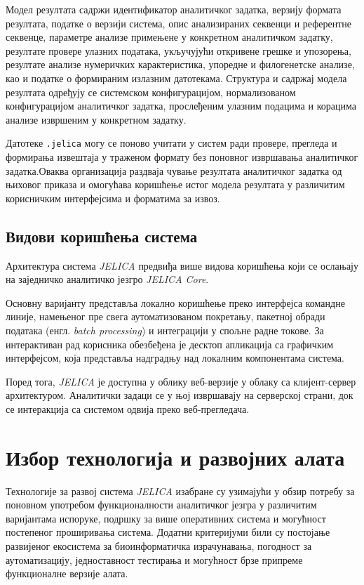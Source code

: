 \documentclass[12pt,oneside]{memoir}
\begin{document}
Модел резултата садржи идентификатор аналитичког задатка, верзију формата резултата, податке о верзији система, опис анализираних секвенци и референтне секвенце, параметре анализе примењене у конкретном аналитичком задатку, резултате провере улазних података, укључујући откривене грешке и упозорења, резултате анализе нумеричких карактеристика, упоредне и филогенетске анализе, као и податке о формираним излазним датотекама. Структура и садржај модела резултата одређују се системском конфигурацијом, нормализованом конфигурацијом аналитичког задатка, прослеђеним улазним подацима и корацима анализе извршеним у конкретном задатку.

Датотеке \texttt{.jelica} могу се поново учитати у систем ради провере, прегледа и формирања извештаја у траженом формату без поновног извршавања аналитичког задатка.Оваква организација раздваја чување резултата аналитичког задатка од њиховог приказа и омогућава коришћење истог модела резултата у различитим корисничким интерфејсима и форматима за извоз.


\subsection{Видови коришћења система}
\label{sec:forms-of-using-the-system}
Архитектура система \textit{JELICA} предвиђа више видова коришћења који се ослањају на заједничко аналитичко језгро \textit{JELICA Core}.

Основну варијанту представља локално коришћење преко интерфејса командне линије, намењеног пре свега аутоматизованом покретању, пакетној обради података (енгл. \textit{batch processing}) и интеграцији у спољне радне токове. За интерактиван рад корисника обезбеђена је десктоп апликација са графичким интерфејсом, која представља надградњу над локалним компонентама система.

Поред тога, \textit{JELICA} је доступна у облику веб-верзије у облаку са клијент-сервер архитектуром. Аналитички задаци се у њој извршавају на серверској страни, док се интеракција са системом одвија преко веб-прегледача.


\section{Избор технологија и развојних алата}
Технологије за развој система \textit{JELICA} изабране су узимајући у обзир потребу за поновном употребом функционалности аналитичког језгра у различитим варијантама испоруке, подршку за више оперативних система и могућност постепеног проширивања система. Додатни критеријуми били су постојање развијеног екосистема за биоинформатичка израчунавања, погодност за аутоматизацију, једноставност тестирања и могућност брзе припреме функционалне верзије алата.
\end{document}
